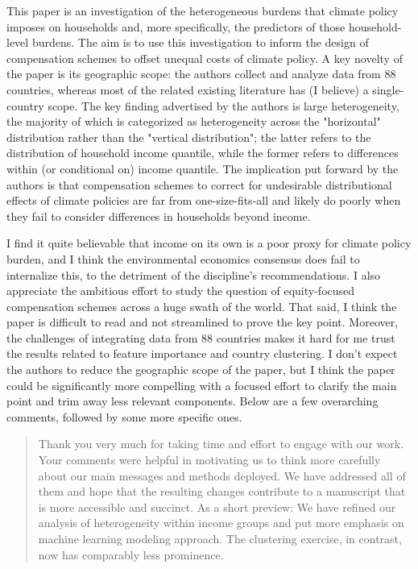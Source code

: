 \documentclass[11pt]{article}
\newenvironment{response}
{\begin{quote}\color{black}}
{\end{quote}}
\begin{document}
\begin{commentbox}
    This paper is an investigation of the heterogeneous burdens that climate policy imposes on households and, more specifically, the predictors of those household-level burdens. The aim is to use this investigation to inform the design of compensation schemes to offset unequal costs of climate policy. A key novelty of the paper is its geographic scope: the authors collect and analyze data from 88 countries, whereas most of the related existing literature has (I believe) a single-country scope. The key finding advertised by the authors is large heterogeneity, the majority of which is categorized as heterogeneity across the "horizontal" distribution rather than the "vertical distribution"; the latter refers to the distribution of household income quantile, while the former refers to differences within (or conditional on) income quantile. The implication put forward by the authors is that compensation schemes to correct for undesirable distributional effects of climate policies are far from one-size-fits-all and likely do poorly when they fail to consider differences in households beyond income.

    I find it quite believable that income on its own is a poor proxy for climate policy burden, and I think the environmental economics consensus does fail to internalize this, to the detriment of the discipline's recommendations. I also appreciate the ambitious effort to study the question of equity-focused compensation schemes across a huge swath of the world. That said, I think the paper is difficult to read and not streamlined to prove the key point. Moreover, the challenges of integrating data from 88 countries makes it hard for me trust the results related to feature importance and country clustering. I don't expect the authors to reduce the geographic scope of the paper, but I think the paper could be significantly more compelling with a focused effort to clarify the main point and trim away less relevant components.
Below are a few overarching comments, followed by some more specific ones.
\end{commentbox}

\begin{response}
    Thank you very much for taking time and effort to engage with our work. Your comments were helpful in motivating us to think more carefully about our main messages and methods deployed. We have addressed all of them and hope that the resulting changes contribute to a manuscript that is more accessible and succinct. As a short preview: We have refined our analysis of heterogeneity within income groups and put more emphasis on machine learning modeling approach. The clustering exercise, in contrast, now has comparably less prominence.
\end{response}
    
\end{document}

